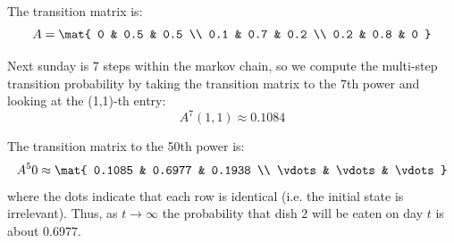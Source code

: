 \documentclass{homework}
\begin{document}
\begin{letterenum}
\item The transition matrix is:
\begin{equation*}
    A = \mat{
        0 & 0.5 & 0.5 \\
        0.1 & 0.7 & 0.2 \\
        0.2 & 0.8 & 0
    }
\end{equation*}

\item Next sunday is 7 steps within the markov chain, so we compute
the multi-step transition probability by taking the transition matrix to the 7th
power and looking at the (1,1)-th entry:
\begin{equation*}
    A^7(1,1) \approx 0.1084
\end{equation*}

\item The transition matrix to the 50th power is:
\begin{equation*}
    A^50 \approx \mat{
        0.1085 & 0.6977 & 0.1938 \\
        \vdots & \vdots & \vdots
    }
\end{equation*}
where the dots indicate that each row is identical (i.e. the initial state is
irrelevant). Thus, as $t\to\infty$ the probability that dish 2 will be eaten
on day $t$ is about 0.6977.
\end{letterenum}
\end{document}
